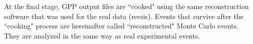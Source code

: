 At the final stage, GPP output files are ``cooked" using the same reconstruction software that was used for the real data (recsis). Events that survive after the ``cooking" process are hereinafter called ``reconstructed" Monte Carlo events. They are analyzed in the same way as real experimental events. 



